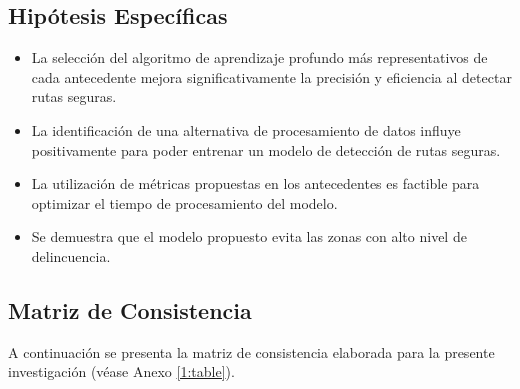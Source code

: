 \subsection{Hipótesis Específicas}
\newcommand{\Hone}{
La selección del algoritmo de aprendizaje profundo más representativos de cada antecedente mejora significativamente la precisión y eficiencia al detectar rutas seguras.
}
\newcommand{\Htwo}{
La identificación de una alternativa de procesamiento de datos influye positivamente para poder entrenar un modelo de detección de rutas seguras.
}
\newcommand{\Hthree}{
La utilización de métricas propuestas en los antecedentes es factible para optimizar el tiempo de procesamiento del modelo.	
}
\newcommand{\Hfour}{
Se demuestra que el modelo propuesto evita las zonas con alto nivel de delincuencia.
}
\begin{itemize}
	\item \Hone
	\item \Htwo
	\item \Hthree
	\item \Hfour
\end{itemize}

\subsection{Matriz de Consistencia}
A continuación se presenta la matriz de consistencia elaborada para la presente investigación (véase Anexo \ref{1:table}).

